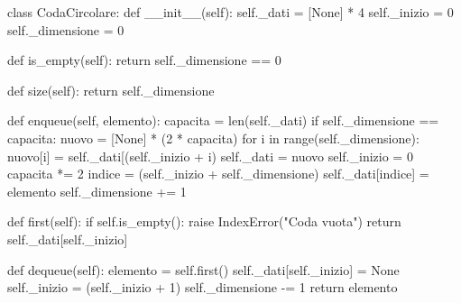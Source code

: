 \begin{unipdcode}[language=Python]
class CodaCircolare:
    def __init__(self):
        self._dati = [None] * 4
        self._inizio = 0
        self._dimensione = 0

    def is_empty(self):
        return self._dimensione == 0

    def size(self):
        return self._dimensione

    def enqueue(self, elemento):
        capacita = len(self._dati)
        if self._dimensione == capacita:
            nuovo = [None] * (2 * capacita)
            for i in range(self._dimensione):
                nuovo[i] = self._dati[(self._inizio + i) %
            self._dati = nuovo
            self._inizio = 0
            capacita *= 2
        indice = (self._inizio + self._dimensione) %
        self._dati[indice] = elemento
        self._dimensione += 1

    def first(self):
        if self.is_empty():
            raise IndexError("Coda vuota")
        return self._dati[self._inizio]

    def dequeue(self):
        elemento = self.first()
        self._dati[self._inizio] = None
        self._inizio = (self._inizio + 1) %
        self._dimensione -= 1
        return elemento
\end{unipdcode}
